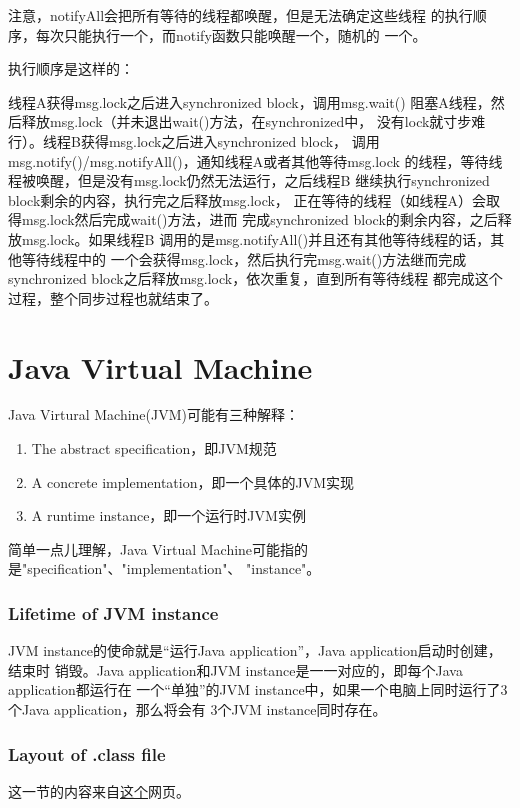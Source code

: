 \documentclass[a4paper,11pt]{article}
\begin{document}
注意，notifyAll会把所有等待的线程都唤醒，但是无法确定这些线程
的执行顺序，每次只能执行一个，而notify函数只能唤醒一个，随机的
一个。

执行顺序是这样的：

线程A获得msg.lock之后进入synchronized block，调用msg.wait()
阻塞A线程，然后释放msg.lock（并未退出wait()方法，在synchronized中，
没有lock就寸步难行）。线程B获得msg.lock之后进入synchronized block，
调用msg.notify()/msg.notifyAll()，通知线程A或者其他等待msg.lock
的线程，等待线程被唤醒，但是没有msg.lock仍然无法运行，之后线程B
继续执行synchronized block剩余的内容，执行完之后释放msg.lock，
正在等待的线程（如线程A）会取得msg.lock然后完成wait()方法，进而
完成synchronized block的剩余内容，之后释放msg.lock。如果线程B
调用的是msg.notifyAll()并且还有其他等待线程的话，其他等待线程中的
一个会获得msg.lock，然后执行完msg.wait()方法继而完成
synchronized block之后释放msg.lock，依次重复，直到所有等待线程
都完成这个过程，整个同步过程也就结束了。


\part[JVM]{Java Virtual Machine}
Java Virtural Machine(JVM)可能有三种解释：
\begin{enumerate}
  \item The abstract specification，即JVM规范
  \item A concrete implementation，即一个具体的JVM实现
  \item A runtime instance，即一个运行时JVM实例
\end{enumerate}
简单一点儿理解，Java Virtual Machine可能指的是"specification"、"implementation"、
"instance"。

\section[Lifetime of JVM instance]{Lifetime of JVM instance}
JVM instance的使命就是“运行Java application”，Java application启动时创建，结束时
销毁。Java application和JVM instance是一一对应的，即每个Java application都运行在
一个“单独”的JVM instance中，如果一个电脑上同时运行了3个Java application，那么将会有
3个JVM instance同时存在。

\section[Layout of .class file]{Layout of .class file}
这一节的内容来自\href{http://hxraid.iteye.com/blog/687660}{这个}网页。
\end{document}
